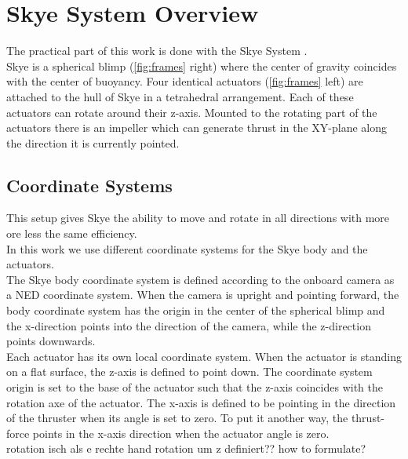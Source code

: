 \section{Skye System Overview}
The practical part of this work is done with the Skye System \citep{Skye2013}.\\
Skye is a spherical blimp (\cref{fig:frames} right) where the center of gravity coincides with the center of buoyancy.
Four identical actuators (\cref{fig:frames} left) are attached to the hull of Skye in a tetrahedral arrangement.
Each of these actuators can rotate around their z-axis.
Mounted to the rotating part of the actuators there is an impeller which can generate thrust in the XY-plane along the direction it is currently pointed.

\subsection{Coordinate Systems}
This setup gives Skye the ability to move and rotate in all directions with more ore less the same efficiency.\\
In this work we use different coordinate systems for the Skye body and the actuators.\\
The Skye body coordinate system is defined according to the onboard camera as a NED coordinate system. 
When the camera is upright and pointing forward, the body coordinate system has the origin in the center of the spherical blimp and the x-direction points into the direction of the camera, while the z-direction points downwards.\\
Each actuator has its own local coordinate system.
When the actuator is standing on a flat surface, the z-axis is defined to point down.
The coordinate system origin is set to the base of the actuator such that the z-axis coincides with the rotation axe of the actuator.
The x-axis is defined to be pointing in the direction of the thruster when its angle is set to zero.
To put it another way, the thrust-force points in the x-axis direction when the actuator angle is zero.\\
rotation isch als e rechte hand rotation um z definiert?? how to formulate?

